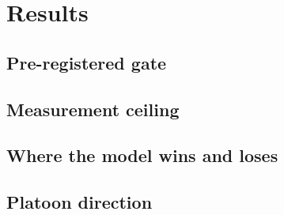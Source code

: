 \documentclass[11pt]{article}
\begin{document}
\section{Results}
\subsection{Pre-registered gate}

\subsection{Measurement ceiling}

\subsection{Where the model wins and loses}

\subsection{Platoon direction}
\end{document}
